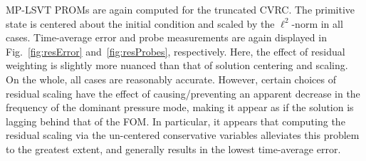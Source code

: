 MP-LSVT PROMs are again computed for the truncated CVRC. The primitive state is centered about the initial condition and scaled by the $\ell^2$-norm in all cases. Time-average error and probe measurements are again displayed in Fig.~\ref{fig:resError} and~\ref{fig:resProbes}, respectively. Here, the effect of residual weighting is slightly more nuanced than that of solution centering and scaling. On the whole, all cases are reasonably accurate. However, certain choices of residual scaling have the effect of causing/preventing an apparent decrease in the frequency of the dominant pressure mode, making it appear as if the solution is lagging behind that of the FOM. In particular, it appears that computing the residual scaling via the un-centered conservative variables alleviates this problem to the greatest extent, and generally results in the lowest time-average error.  